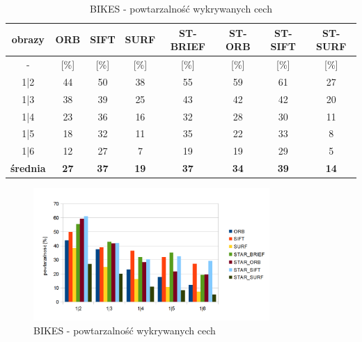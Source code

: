 \begin{table}[htbp]
  \centering
  \caption{BIKES - powtarzalność wykrywanych cech}
    \begin{tabular}{|c|c|c|c|c|c|c|c|}\hline

    obrazy & \textbf{ORB} & \textbf{SIFT} & \textbf{SURF} & \textbf{ST-BRIEF} & \textbf{ST-ORB} & \textbf{ST-SIFT} & \textbf{ST-SURF} \\\hline

    -  & [\%] & [\%] & [\%] & [\%] & [\%] & [\%] & [\%] \\\hline
    1|2 & 44 & 50 & 38 & 55 & 59 & 61 & 27 \\
    1|3 & 38 & 39 & 25 & 43 & 42 & 42 & 20 \\
    1|4 & 23 & 36 & 16 & 32 & 28 & 30 & 11 \\
    1|5 & 18 & 32 & 11 & 35 & 22 & 33 & 8 \\
    1|6 & 12 & 27 & 7 & 19 & 19 & 29 & 5 \\\hline
    \textbf{średnia} & \textbf{27} & \textbf{37} & \textbf{19} & \textbf{37} & \textbf{34} & \textbf{39} & \textbf{14} \\\hline
    

    \end{tabular}%
  \label{tab:bikes_m1}%
\end{table}%


\begin{figure}
\centering
\includegraphics[width=0.8\textwidth]{pict/mikolajczyk/bikes/m1.png}
\caption{BIKES - powtarzalność wykrywanych cech}
\label{fig:bikes_m1}
\end{figure}

